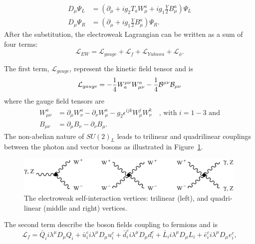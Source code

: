 \begin{align}
  \label{eq:theory:ewcov}
  D_\mu \Psi_L &=(\partial_{\mu} + ig_2 T_a W_{\mu}^a + ig_1 \frac{Y}{2} B_{\mu}^a)\Psi_L\\
  D_\mu \Psi_R &=(\partial_{\mu} + ig_1 \frac{Y}{2} B_{\mu}^a)\Psi_R.
\end{align}
After the substitution, the electroweak Lagrangian can be written as a sum of four terms:
\begin{equation}
  \label{eq:theory:ewl}
   \mathcal{L}_{EW} = \mathcal{L}_{gauge}+\mathcal{L}_{f}+\mathcal{L}_{Yukawa}+\mathcal{L}_{\phi}.
\end{equation}
\par The first term, $\mathcal{L}_{gauge}$, represent the kinetic field tensor and is
\begin{equation}
  \label{eq:theory:gauge}
   \mathcal{L}_{gauge} = -\frac{1}{4}W_{a}^{\mu\nu}W^{a}_{\mu\nu} - \frac{1}{4}{\cal B}^{\mu\nu}{\cal B}_{\mu\nu}
\end{equation}
where the gauge field tensors are
\begin{align}
W_{\mu\nu}^a &=\partial_{\mu} W_{\nu}^a-\partial_{\nu} W_{\mu}^a-g_2\epsilon^{ijk}W^{j}_{\mu}W^{k}_{\nu} \quad \textrm{, with   } i=1-3\textrm{ and}\\
B_{\mu\nu} &=\partial_{\mu} B_{\nu}-\partial_{\nu} B_{\mu}.
\end{align}
The non-abelian nature of $SU (2)_L$ leads to trilinear and quadrilinear couplings between the photon and vector bosons as illustrated in Figure~\ref{fig:theory:weakint}.
\begin{figure}[h!]
\centering
\includegraphics[width=0.99\textwidth]{figures/theory/weak_selfinteraction.png}
\caption{The electroweak self-interaction vertices: trilinear (left), and quadri-linear (middle and right) vertices.}
\label{fig:theory:weakint}
\end{figure}
\par The second term describe the boson fields coupling to fermions and is
\begin{equation}
  \label{eq:theory:gauge}
   \mathcal{L}_{f} = \bar{Q}_ii\lambda^{\mu}D_{\mu} Q_i + \bar{u}_i^ci\lambda^{\mu}D_{\mu} u_i^c
                   + \bar{d}_i^ci\lambda^{\mu}D_{\mu} d_i^c + \bar{L}_ii\lambda^{\mu}D_{\mu} L_i +  
                     \bar{e}_i^ci\lambda^{\mu}D_{\mu} e^c_i,
\end{equation}
